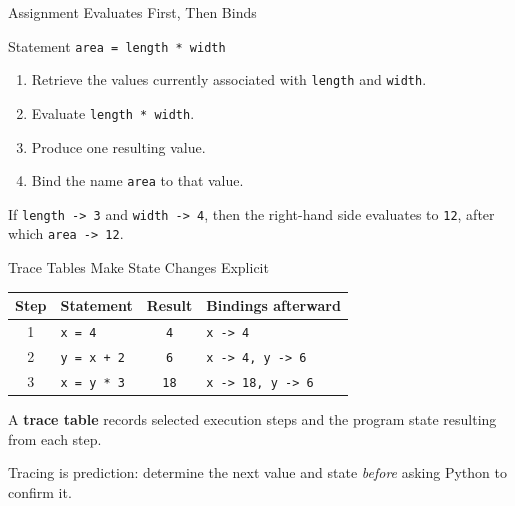 \documentclass[aspectratio=169,10pt]{beamer}
\begin{document}
\begin{frame}{Assignment Evaluates First, Then Binds}
  \begin{block}{Statement}
    \centering
    \Large\texttt{area = length * width}
  \end{block}

  \begin{enumerate}
    \item Retrieve the values currently associated with \texttt{length} and \texttt{width}.
    \item Evaluate \texttt{length * width}.
    \item Produce one resulting value.
    \item Bind the name \texttt{area} to that value.
  \end{enumerate}

  \begin{exampleblockcp}
    If \texttt{length -> 3} and \texttt{width -> 4}, then the right-hand side evaluates to \texttt{12}, after which \texttt{area -> 12}.
  \end{exampleblockcp}
\end{frame}

\begin{frame}{Trace Tables Make State Changes Explicit}
  \begin{center}
    \renewcommand{\arraystretch}{1.35}
    \begin{tabular}{c|l|c|l}
      \textbf{Step} & \textbf{Statement} & \textbf{Result} & \textbf{Bindings afterward} \\\hline
      1 & \texttt{x = 4} & \texttt{4} & \texttt{x -> 4} \\
      2 & \texttt{y = x + 2} & \texttt{6} & \texttt{x -> 4, y -> 6} \\
      3 & \texttt{x = y * 3} & \texttt{18} & \texttt{x -> 18, y -> 6}
    \end{tabular}
  \end{center}

  \begin{cpdefinition}
    A \textbf{trace table} records selected execution steps and the program state resulting from each step.
  \end{cpdefinition}

  \begin{keyidea}
    Tracing is prediction: determine the next value and state \emph{before} asking Python to confirm it.
  \end{keyidea}
\end{frame}
\end{document}
